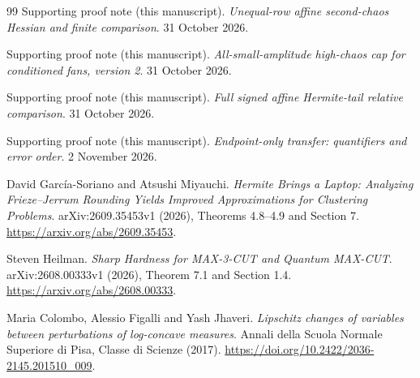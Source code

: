 \begin{thebibliography}{99}
Supporting proof note (this manuscript). \emph{Unequal-row affine second-chaos Hessian and finite comparison}. 31 October 2026.
\par{}

Supporting proof note (this manuscript). \emph{All-small-amplitude high-chaos cap for conditioned fans, version 2}. 31 October 2026.
\par{}

Supporting proof note (this manuscript). \emph{Full signed affine Hermite-tail relative comparison}. 31 October 2026.
\par{}

Supporting proof note (this manuscript). \emph{Endpoint-only transfer: quantifiers and error order}. 2 November 2026.
\par{}

David Garc\'ia-Soriano and Atsushi Miyauchi.
\emph{Hermite Brings a Laptop: Analyzing Frieze--Jerrum Rounding Yields Improved Approximations for Clustering Problems}.
arXiv:2609.35453v1 (2026), Theorems 4.8--4.9 and Section 7.
\url{https://arxiv.org/abs/2609.35453}.

Steven Heilman. \emph{Sharp Hardness for MAX-3-CUT and Quantum MAX-CUT}.
arXiv:2608.00333v1 (2026), Theorem 7.1 and Section 1.4.
\url{https://arxiv.org/abs/2608.00333}.

Maria Colombo, Alessio Figalli and Yash Jhaveri.
\emph{Lipschitz changes of variables between perturbations of log-concave measures}.
Annali della Scuola Normale Superiore di Pisa, Classe di Scienze (2017).
\url{https://doi.org/10.2422/2036-2145.201510_009}.

\end{thebibliography}
\endgroup
